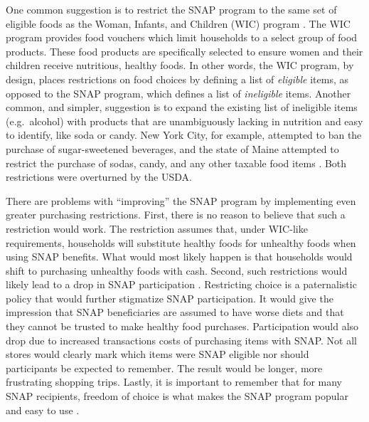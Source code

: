 \documentclass[12pt,letterpaperpaper,]{book}
\begin{document}
One common suggestion is to restrict the SNAP program to the same set of
eligible foods as the Woman, Infants, and Children (WIC) program
\citep{dinour_food_2007}. The WIC program provides food vouchers which
limit households to a select group of food products. These food products
are specifically selected to ensure women and their children receive
nutritious, healthy foods. In other words, the WIC program, by design,
places restrictions on food choices by defining a list of
\emph{eligible} items, as opposed to the SNAP program, which defines a
list of \emph{ineligible} items. Another common, and simpler, suggestion
is to expand the existing list of ineligible items (e.g.~alcohol) with
products that are unambiguously lacking in nutrition and easy to
identify, like soda or candy. New York City, for example, attempted to
ban the purchase of sugar-sweetened beverages, and the state of Maine
attempted to restrict the purchase of sodas, candy, and any other
taxable food items \citep{gundersen_snap_2015}. Both restrictions were
overturned by the USDA.

There are problems with ``improving'' the SNAP program by implementing
even greater purchasing restrictions. First, there is no reason to
believe that such a restriction would work. The restriction assumes
that, under WIC-like requirements, households will substitute healthy
foods for unhealthy foods when using SNAP benefits. What would most
likely happen is that households would shift to purchasing unhealthy
foods with cash. Second, such restrictions would likely lead to a drop
in SNAP participation \citep{gundersen_snap_2015}. Restricting choice is
a paternalistic policy that would further stigmatize SNAP participation.
It would give the impression that SNAP beneficiaries are assumed to have
worse diets and that they cannot be trusted to make healthy food
purchases. Participation would also drop due to increased transactions
costs of purchasing items with SNAP. Not all stores would clearly mark
which items were SNAP eligible nor should participants be expected to
remember. The result would be longer, more frustrating shopping trips.
Lastly, it is important to remember that for many SNAP recipients,
freedom of choice is what makes the SNAP program popular and easy to use
\citep{edin_snap_2013}.
\end{document}
